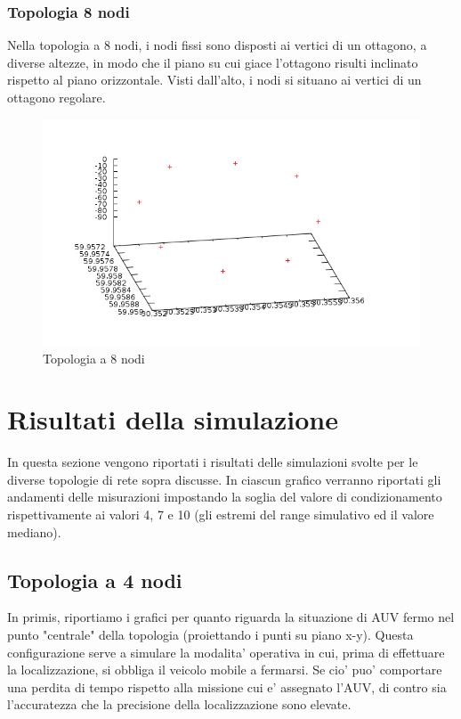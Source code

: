\subsubsection{Topologia 8 nodi}
Nella topologia a 8 nodi, i nodi fissi sono disposti ai vertici di un ottagono, a diverse altezze, in modo che il piano su cui giace l'ottagono risulti inclinato rispetto al piano orizzontale. Visti dall'alto, i nodi si situano ai vertici di un ottagono regolare. 
\begin{figure}[H]
    \centering
    \includegraphics[width=\linewidth]{topologyoctagon.png}
    \caption{Topologia a 8 nodi}
    \label{fig:my_label}
\end{figure}

\section{Risultati della simulazione}
In questa sezione vengono riportati i risultati delle simulazioni svolte per le diverse topologie di rete sopra discusse. In ciascun grafico verranno riportati gli andamenti delle misurazioni impostando la soglia del valore di condizionamento rispettivamente ai valori 4, 7 e 10 (gli estremi del range simulativo ed il valore mediano).  
\subsection{Topologia a 4 nodi}
In primis, riportiamo i grafici per quanto riguarda la situazione di AUV fermo nel punto "centrale" della topologia (proiettando i punti su piano x-y). Questa configurazione serve a simulare la modalita' operativa in cui, prima di effettuare la localizzazione, si obbliga il veicolo mobile a fermarsi. Se cio' puo' comportare una perdita di tempo rispetto alla missione cui e' assegnato l'AUV, di contro sia l'accuratezza che la precisione della localizzazione sono elevate.

